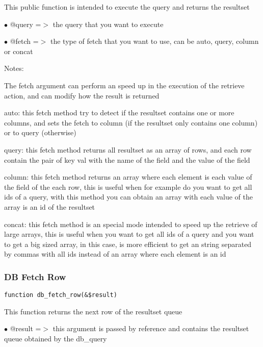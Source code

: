 \documentclass[a4paper]{article}
\begin{document}
This public function is intended to execute the query and returns the resultset

\begin{compactitem}
\item[\color{myblue}$\bullet$] @query =$>$ the query that you want to execute
\item[\color{myblue}$\bullet$] @fetch =$>$ the type of fetch that you want to use, can be auto, query, column or concat
\end{compactitem}

Notes:

The fetch argument can perform an speed up in the execution of the retrieve action, and
can modify how the result is returned

auto: this fetch method try to detect if the resultset contains one or more columns, and
sets the fetch to column (if the resultset only contains one column) or to query (otherwise)

query: this fetch method returns all resultset as an array of rows, and each row contain the
pair of key val with the name of the field and the value of the field

column: this fetch method returns an array where each element is each value of the field of
the each row, this is useful when for example do you want to get all ids of a query, with
this method you can obtain an array with each value of the array is an id of the resultset

concat: this fetch method is an special mode intended to speed up the retrieve of large
arrays, this is useful when you want to get all ids of a query and you want to get a big
sized array, in this case, is more efficient to get an string separated by commas with all
ids instead of an array where each element is an id

\hypertarget{toc88}{}
\subsubsection{DB Fetch Row}

\begin{lstlisting}
function db_fetch_row(&$result)
\end{lstlisting}

This function returns the next row of the resultset queue

\begin{compactitem}
\item[\color{myblue}$\bullet$] @result =$>$ this argument is passed by reference and contains the resultset queue
           obtained by the db\_query
\end{compactitem}
\end{document}
